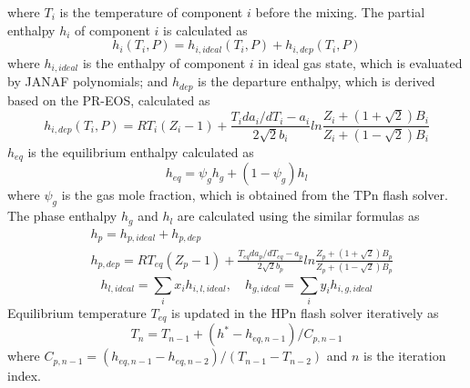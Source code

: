 {    where $T_i$ is the temperature of component $i$ before the mixing. The partial enthalpy $h_i$ of component $i$ is calculated as
    \begin{equation}
        h_i\left(T_i, P\right)=h_{i, ideal}\left(T_i, P\right)+h_{i, dep}\left(T_i, P\right)
    \end{equation}
    where $h_{i, ideal}$ is the enthalpy of component $i$ in ideal gas state, which is evaluated by JANAF polynomials; and $h_{dep}$ is the departure enthalpy, which is derived based on the PR-EOS, calculated as
    \begin{equation}
        h_{i, dep}\left(T_i, P\right)=RT_i\left(Z_i-1\right)+\frac{T_i da_i/dT_i-a_i}{2\sqrt{2}b_i}ln\frac{Z_i+\left(1+\sqrt{2}\right)B_i}{Z_i+\left(1-\sqrt{2}\right)B_i}\label{eq:8}
    \end{equation}
    $h_{eq}$ is the equilibrium enthalpy calculated as
    \begin{equation}
        h_{eq}=\psi_{g}h_{g}+\left(1-\psi_{g}\right)h_{l}\label{eq:9}
    \end{equation}
    where $\psi_g$ is the gas mole fraction, which is obtained from the TPn flash solver. The phase enthalpy $h_g$ and $h_l$ are calculated using the similar formulas as
    \begin{align}
         & h_{p}=h_{p, ideal}+h_{p, dep}                                                                                                                                                       \\
         & h_{p, dep}=RT_{eq}\left(Z_{p}-1\right)+\frac{T_{eq} da_{p}/dT_{eq}-a_{p}}{2\sqrt{2}b_p}ln\frac{Z_{p}+\left(1+\sqrt{2}\right)B_{p}}{Z_{p}+\left(1-\sqrt{2}\right)B_{p}}\label{eq:10}
    \end{align}
    \begin{equation}
        h_{l, ideal}=\sum_ix_ih_{i, l, ideal},\quad h_{g, ideal}=\sum_iy_ih_{i, g, ideal}\label{eq:11}
    \end{equation}
    Equilibrium temperature $T_{eq}$ is updated in the HPn flash solver iteratively as
    \begin{equation}
        T_{n}=T_{n-1}+\left(h^{*}-h_{eq, n-1}\right)\Big/C_{p,n-1}\label{eq:12}
    \end{equation}
    where $C_{p,n-1}=(h_{eq, n-1}-h_{eq, n-2})/(T_{n-1}-T_{n-2})$ and $n$ is the iteration index.
}
